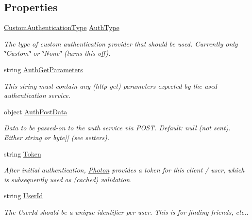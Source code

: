 \subsection*{Properties}
\begin{DoxyCompactItemize}
\item 
\hyperlink{_loadbalancing_peer_8cs_aeb4d921fa77465ceb160913c4950e257}{Custom\+Authentication\+Type} \hyperlink{class_authentication_values_a6902d22f3f59653cac4ee895273ed5c5}{Auth\+Type}
\begin{DoxyCompactList}\small\item\em The type of custom authentication provider that should be used. Currently only \char`\"{}\+Custom\char`\"{} or \char`\"{}\+None\char`\"{} (turns this off).\end{DoxyCompactList}\item 
string \hyperlink{class_authentication_values_a960384fb735ced0be6ee2d3e365fd5aa}{Auth\+Get\+Parameters}
\begin{DoxyCompactList}\small\item\em This string must contain any (http get) parameters expected by the used authentication service. \end{DoxyCompactList}\item 
object \hyperlink{class_authentication_values_ae5df4bb87c20c0e83e1f13ca126a3b5f}{Auth\+Post\+Data}
\begin{DoxyCompactList}\small\item\em Data to be passed-\/on to the auth service via P\+O\+ST. Default\+: null (not sent). Either string or byte\mbox{[}\mbox{]} (see setters).\end{DoxyCompactList}\item 
string \hyperlink{class_authentication_values_a0fa90664bfe590fec56cf4f399ff26b2}{Token}
\begin{DoxyCompactList}\small\item\em After initial authentication, \hyperlink{namespace_photon}{Photon} provides a token for this client / user, which is subsequently used as (cached) validation.\end{DoxyCompactList}\item 
string \hyperlink{class_authentication_values_a60a4d92454c4b2bbca1f299631da2f94}{User\+Id}
\begin{DoxyCompactList}\small\item\em The User\+Id should be a unique identifier per user. This is for finding friends, etc..\end{DoxyCompactList}\end{DoxyCompactItemize}


